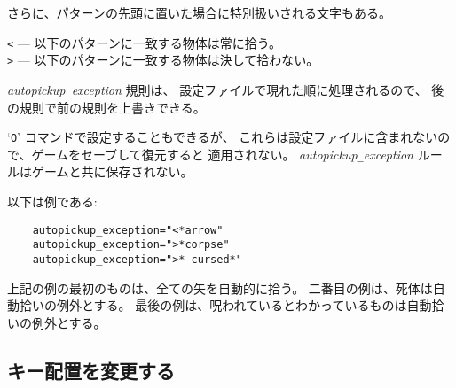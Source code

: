 さらに、パターンの先頭に置いた場合に特別扱いされる文字もある。

{\tt <} --- 以下のパターンに一致する物体は常に拾う。\\
{\tt >} --- 以下のパターンに一致する物体は決して拾わない。

{\it autopickup\verb+_+exception\/} 規則は、
設定ファイルで現れた順に処理されるので、
後の規則で前の規則を上書きできる。

`{\tt O}' コマンドで設定することもできるが、
これらは設定ファイルに含まれないので、ゲームをセーブして復元すると
適用されない。
{\it autopickup\verb+_+exception\/} ルールはゲームと共に保存されない。
\elist

以下は例である:
\begin{verbatim}
    autopickup_exception="<*arrow"
    autopickup_exception=">*corpse"
    autopickup_exception=">* cursed*"
\end{verbatim}

上記の例の最初のものは、全ての矢を自動的に拾う。
二番目の例は、死体は自動拾いの例外とする。
最後の例は、呪われているとわかっているものは自動拾いの例外とする。


\subsection*{キー配置を変更する}

